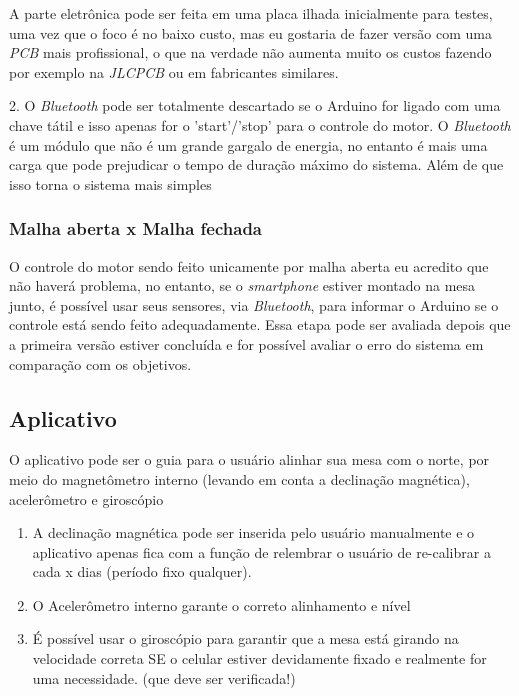 \documentclass[a4paper, 12pt]{article}
\begin{document}
A parte eletrônica pode ser feita em uma placa ilhada inicialmente para testes, uma vez que o foco é no baixo custo, mas eu gostaria de fazer versão com uma \textit{PCB} mais profissional, o que na verdade não aumenta muito os custos fazendo por exemplo na \textit{JLCPCB} ou em fabricantes similares. 

2. O \textit{Bluetooth} pode ser totalmente descartado se o Arduino for ligado com uma chave tátil e isso apenas for o 'start'/'stop' para o controle do motor. O \textit{Bluetooth} é um módulo que não é um grande gargalo de energia, no entanto é mais uma carga que pode prejudicar o tempo de duração máximo do sistema. Além de que isso torna o sistema mais simples

\subsubsection{Malha aberta x Malha fechada}

O controle do motor sendo feito unicamente por malha aberta eu acredito que não haverá problema, no entanto, se o \textit{smartphone} estiver montado na mesa junto, é possível usar seus sensores, via \textit{Bluetooth}, para informar o Arduino se o controle está sendo feito adequadamente. Essa etapa pode ser avaliada depois que a primeira versão estiver concluída e for possível avaliar o erro do sistema em comparação com os objetivos.

\subsection{Aplicativo}

O aplicativo pode ser o guia para o usuário alinhar sua mesa com o norte, por meio do magnetômetro interno (levando em conta a declinação magnética), acelerômetro e giroscópio

\begin{enumerate}
	\item A declinação magnética pode ser inserida pelo usuário manualmente e o aplicativo apenas fica com a função de relembrar o usuário de re-calibrar a cada x dias (período fixo qualquer).

	\item O Acelerômetro interno garante o correto alinhamento e nível
	
	\item É possível usar o giroscópio para garantir que a mesa está girando na velocidade correta SE o celular estiver devidamente fixado e realmente for uma necessidade. (que deve ser verificada!)
\end{enumerate}
\end{document}
